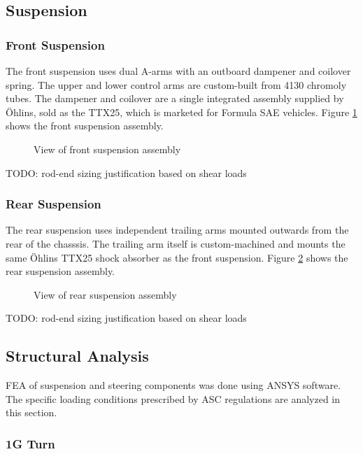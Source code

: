 \documentclass[10pt]{article}
\begin{document}
\subsection{Suspension}
\subsubsection{Front Suspension}
The front suspension uses dual A-arms with an outboard dampener and coilover spring. The upper and lower control arms are custom-built from 4130 chromoly tubes. The dampener and coilover are a single integrated assembly supplied by \"Ohlins, sold as the TTX25, which is marketed for Formula SAE vehicles. Figure \ref{fig:front-suspension} shows the front suspension assembly.

\begin{figure}
\centering
\caption{View of front suspension assembly}
\label{fig:front-suspension}
\end{figure}

TODO: rod-end sizing justification based on shear loads

\subsubsection{Rear Suspension}
The rear suspension uses independent trailing arms mounted outwards from the rear of the chasssis. The trailing arm itself is custom-machined and mounts the same \"Ohlins TTX25 shock absorber as the front suspension. Figure \ref{fig:rear-suspension} shows the rear suspension assembly.

\begin{figure}
\centering
\caption{View of rear suspension assembly}
\label{fig:rear-suspension}
\end{figure}

TODO: rod-end sizing justification based on shear loads

\subsection{Structural Analysis}
FEA of suspension and steering components was done using ANSYS software. The specific loading conditions prescribed by ASC regulations are analyzed in this section.

\subsubsection{1G Turn}
\end{document}
